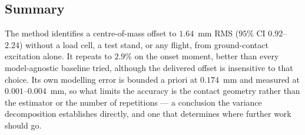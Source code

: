 \documentclass[10pt]{article}
\begin{document}

\subsection*{Summary}

The method identifies a centre-of-mass offset to $1.64$~mm RMS
($95\%$ CI $0.92$--$2.24$) without a load cell, a test stand, or any
flight, from ground-contact excitation alone. It repeats to $2.9\%$ on
the onset moment, better than every model-agnostic baseline tried,
although the delivered offset is insensitive to that choice. Its own
modelling error is bounded a priori at $0.174$~mm and measured at
$0.001$--$0.004$~mm, so what limits the accuracy is the contact
geometry rather than the estimator or the number of repetitions ---
a conclusion the variance decomposition establishes directly, and one
that determines where further work should go.
\end{document}
